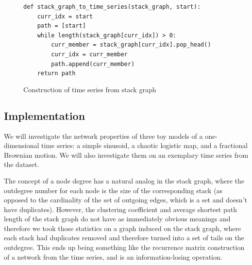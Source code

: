 \documentclass[12pt]{article}
\begin{document}
\begin{figure}\label{fig:timeconstructionalgo}
\begin{singlespace}
\begin{verbatim}
def stack_graph_to_time_series(stack_graph, start):
    curr_idx = start
    path = [start]
    while length(stack_graph[curr_idx]) > 0:
        curr_member = stack_graph[curr_idx].pop_head()
        curr_idx = curr_member
        path.append(curr_member)
    return path
\end{verbatim}
\end{singlespace}
  \caption{Construction of time series from stack graph}
\end{figure}

\subsection{Implementation}

We will investigate the network properties of three toy models of a one-dimensional time series: a simple sinusoid, a chaotic logistic map, and a fractional Brownian motion. We will also investigate them on an exemplary time series from the dataset.

The concept of a node degree has a natural analog in the stack graph, where the outdegree number for each node is the size of the corresponding stack (as opposed to the cardinality of the set of outgoing edges, which is a set and doesn't have duplicates). However, the clustering coefficient and average shortest path length of the stack graph do not have as immediately obvious meanings and therefore we took those statistics on a graph induced on the stack graph, where each stack had duplicates removed and therefore turned into a set of tails on the outdegree. This ends up being something like the recurrence matrix construction\cite{recurrencegraph} of a network from the time series, and is an information-losing operation.
\end{document}
